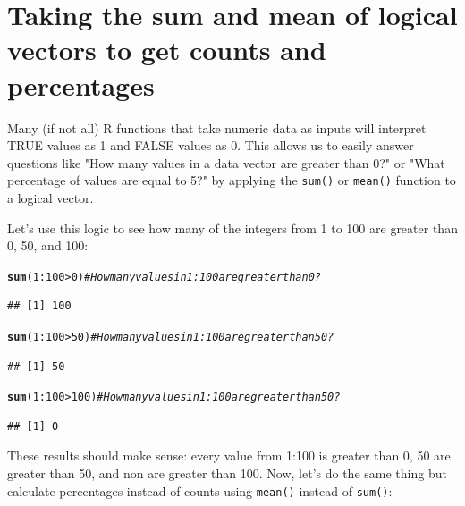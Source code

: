 \documentclass{tufte-book}\usepackage[]{graphicx}\usepackage[]{color}
\makeatletter
\newcommand{\hlnum}[1]{\textcolor[rgb]{0.686,0.059,0.569}{#1}}%
\newcommand{\hlcom}[1]{\textcolor[rgb]{0.678,0.584,0.686}{\textit{#1}}}%
\newcommand{\hlopt}[1]{\textcolor[rgb]{0,0,0}{#1}}%
\newcommand{\hlstd}[1]{\textcolor[rgb]{0.345,0.345,0.345}{#1}}%
\newcommand{\hlkwd}[1]{\textcolor[rgb]{0.737,0.353,0.396}{\textbf{#1}}}%
\newenvironment{kframe}{%
 \def\at@end@of@kframe{}%
 \ifinner\ifhmode%
  \def\at@end@of@kframe{\end{minipage}}%
  \begin{minipage}{\columnwidth}%
 \fi\fi%
 \def\FrameCommand##1{\hskip\@totalleftmargin \hskip-\fboxsep
 \colorbox{shadecolor}{##1}\hskip-\fboxsep
     \hskip-\linewidth \hskip-\@totalleftmargin \hskip\columnwidth}%
 \MakeFramed {\advance\hsize-\width
   \@totalleftmargin\z@ \linewidth\hsize
   \@setminipage}}%
 {\par\unskip\endMakeFramed%
 \at@end@of@kframe}
\newenvironment{knitrout}{}{} %
\makeatother
\begin{document}
\section{Taking the sum and mean of logical vectors to get counts and percentages}

Many (if not all) R functions that take numeric data as inputs will interpret TRUE values as 1 and FALSE values as 0. This allows us to easily answer questions like "How many values in a data vector are greater than 0?" or "What percentage of values are equal to 5?" by applying the \texttt{sum()} or \texttt{mean()} function to a logical vector.

Let's use this logic to see how many of the integers from 1 to 100 are greater than 0, 50, and 100:

\begin{knitrout}
\color{fgcolor}\begin{kframe}
\begin{alltt}
\hlkwd{sum}\hlstd{(}\hlnum{1}\hlopt{:}\hlnum{100} \hlopt{>} \hlnum{0}\hlstd{)} \hlcom{# How many values in 1:100 are greater than 0?}
\end{alltt}
\begin{verbatim}
## [1] 100
\end{verbatim}
\begin{alltt}
\hlkwd{sum}\hlstd{(}\hlnum{1}\hlopt{:}\hlnum{100} \hlopt{>} \hlnum{50}\hlstd{)} \hlcom{# How many values in 1:100 are greater than 50?}
\end{alltt}
\begin{verbatim}
## [1] 50
\end{verbatim}
\begin{alltt}
\hlkwd{sum}\hlstd{(}\hlnum{1}\hlopt{:}\hlnum{100} \hlopt{>} \hlnum{100}\hlstd{)} \hlcom{# How many values in 1:100 are greater than 50?}
\end{alltt}
\begin{verbatim}
## [1] 0
\end{verbatim}
\end{kframe}
\end{knitrout}

These results should make sense: every value from 1:100 is greater than 0, 50 are greater than 50, and non are greater than 100. Now, let's do the same thing but calculate percentages instead of counts using \texttt{mean()} instead of \texttt{sum()}:
\end{document}
